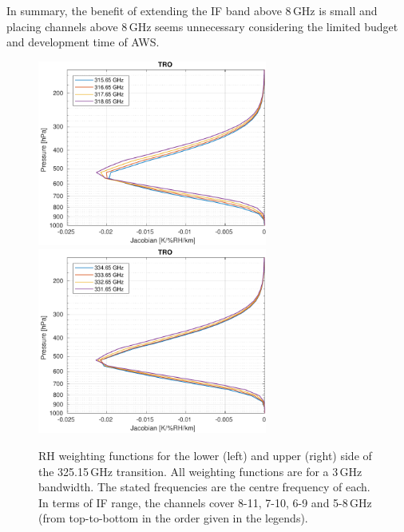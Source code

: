 \documentclass[12pt]{article}
\begin{document}
In summary, the benefit of extending the IF band above 8\,GHz is small and
placing channels above 8\,GHz seems unnecessary considering the limited budget
and development time of AWS.

\begin{figure}[!p]
  \centering
  \includegraphics[height=61mm]{fascod_wf_325l_tro}\hspace{5mm}%
  \includegraphics[clip,trim=43 0 0 0,height=61mm]{fascod_wf_325u_tro}
  \caption{RH weighting functions for the lower (left) and upper (right) side
    of the 325.15\,GHz transition. All weighting functions are for a 3\,GHz
    bandwidth. The stated frequencies are the centre frequency of each. In
    terms of IF range, the channels cover 8-11, 7-10, 6-9 and 5-8\,GHz (from
    top-to-bottom in the order given in the legends). }
  \label{fig:wfuns:325ul}
\end{figure}
\end{document}
